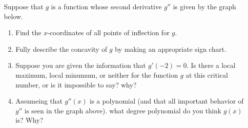 \documentclass{ximera}
\begin{document}
\begin{exercise}
    Suppose that $g$ is a function whose second derivative $g''$ is given by the graph below. 
    \begin{image}
    \end{image}
    \begin{enumerate}
         \item Find the $x$-coordinates of all points of inflection for $g$.
    \item Fully describe the concavity of $g$ by making an appropriate sign chart.
    \item Suppose you are given the information that $g'(-2)=0$.  Is there a local maximum, local minumum, or neither for the function $g$ at this critical number, or is it impossible to say?  why?
    \item Assumeing that $g''(x)$ is a polynomial (and that all important behavior of $g''$ is seen in the graph above). what degree polynomial do you think $g(x)$ is?  Why?
    \end{enumerate}
   
\end{exercise}
\end{document}
